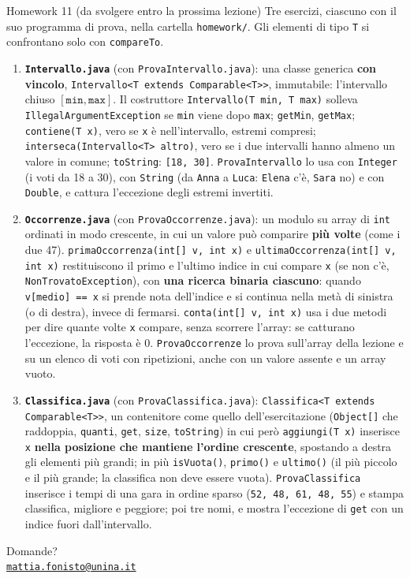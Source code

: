 \documentclass[10pt,aspectratio=169,xcolor={table}]{beamer}
\begin{document}
\begin{frame}{Homework 11 (da svolgere entro la prossima lezione)}
\footnotesize\setlength{\parskip}{0pt}
Tre esercizi, ciascuno con il suo programma di prova, nella cartella \texttt{homework/}. Gli elementi di tipo \texttt{T} si confrontano solo con \texttt{compareTo}.
\begin{enumerate}\itemsep=3pt
    \item \textbf{\texttt{Intervallo.java}} (con \texttt{ProvaIntervallo.java}): una classe generica \textbf{con vincolo}, \texttt{Intervallo<T extends Comparable<T>>}, immutabile: l'intervallo chiuso $[\texttt{min}, \texttt{max}]$. Il costruttore \texttt{Intervallo(T min, T max)} solleva \texttt{IllegalArgumentException} se \texttt{min} viene dopo \texttt{max}; \texttt{getMin}, \texttt{getMax}; \texttt{contiene(T x)}, vero se \texttt{x} è nell'intervallo, estremi compresi; \texttt{interseca(Intervallo<T> altro)}, vero se i due intervalli hanno almeno un valore in comune; \texttt{toString}: \texttt{[18, 30]}. \texttt{ProvaIntervallo} lo usa con \texttt{Integer} (i voti da 18 a 30), con \texttt{String} (da \texttt{Anna} a \texttt{Luca}: \texttt{Elena} c'è, \texttt{Sara} no) e con \texttt{Double}, e cattura l'eccezione degli estremi invertiti.
    \item \textbf{\texttt{Occorrenze.java}} (con \texttt{ProvaOccorrenze.java}): un modulo su array di \texttt{int} ordinati in modo crescente, in cui un valore può comparire \textbf{più volte} (come i due 47). \texttt{primaOccorrenza(int[] v, int x)} e \texttt{ultimaOccorrenza(int[] v, int x)} restituiscono il primo e l'ultimo indice in cui compare \texttt{x} (se non c'è, \texttt{NonTrovatoException}), con \textbf{una ricerca binaria ciascuno}: quando \texttt{v[medio] == x} si prende nota dell'indice e si continua nella metà di sinistra (o di destra), invece di fermarsi. \texttt{conta(int[] v, int x)} usa i due metodi per dire quante volte \texttt{x} compare, senza scorrere l'array: se catturano l'eccezione, la risposta è 0. \texttt{ProvaOccorrenze} lo prova sull'array della lezione e su un elenco di voti con ripetizioni, anche con un valore assente e un array vuoto.
    \item \textbf{\texttt{Classifica.java}} (con \texttt{ProvaClassifica.java}): \texttt{Classifica<T extends Comparable<T>>}, un contenitore come quello dell'esercitazione (\texttt{Object[]} che raddoppia, \texttt{quanti}, \texttt{get}, \texttt{size}, \texttt{toString}) in cui però \texttt{aggiungi(T x)} inserisce \texttt{x} \textbf{nella posizione che mantiene l'ordine crescente}, spostando a destra gli elementi più grandi; in più \texttt{isVuota()}, \texttt{primo()} e \texttt{ultimo()} (il più piccolo e il più grande; la classifica non deve essere vuota). \texttt{ProvaClassifica} inserisce i tempi di una gara in ordine sparso (\texttt{52, 48, 61, 48, 55}) e stampa classifica, migliore e peggiore; poi tre nomi, e mostra l'eccezione di \texttt{get} con un indice fuori dall'intervallo.
\end{enumerate}
\end{frame}

\begin{frame}
\begin{center}
{\Huge Domande?}\\[2em]
{\normalsize \href{mailto:mattia.fonisto@unina.it}{\texttt{mattia.fonisto@unina.it}}}
\end{center}
\end{frame}
\end{document}
